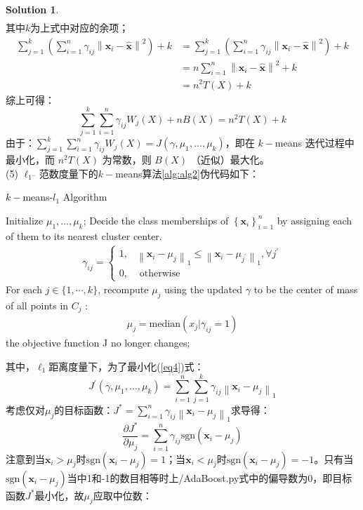 \documentclass[a4paper,UTF8]{article}
\theoremstyle{definition}
\newtheorem*{solution}{Solution}
\begin{document}
\begin{solution}
\begin{align*}
	\end{align*}
	其中$k$为上式中对应的余项；
	\begin{align*}
	\sum_{j=1}^{k}\left(\sum_{i=1}^{n}\gamma_{i j}\left\|\mathbf{x}_{i}-\hat{\mathbf{x}}\right\|^{2}\right)+k&=\sum_{j=1}^{k}\left(\sum_{i=1}^{n}\gamma_{i j}\left\|\mathbf{x}_{i}-\hat{\mathbf{x}}\right\|^{2}\right)+k\\&=n\sum_{i=1}^{n}\left\|\mathbf{x}_{i}-\hat{\mathbf{x}}\right\|^{2}+k\\&=n^2T(X)+k
	\end{align*}	
	综上可得：$$\sum_{j=1}^{k}\sum_{i=1}^{n}\gamma_{i j}W_j(X)+nB(X)=n^2T(X)+k$$ 
	由于：$\sum_{j=1}^{k}\sum_{i=1}^{n}\gamma_{i j}W_j(X)=J\left(\gamma, \mu_{1}, \ldots, \mu_{k}\right)$，即在 $k-$means 迭代过程中最小化，而 $n^2T(X)$ 为常数，则 $B(X)$ （近似）最大化。
 \\(5) $\ell_{1^{-}}$范数度量下的$k-$means算法\ref{alg:alg2}伪代码如下：\\
 {\begin{algorithm}[htbp]
		\caption{ $k-$means-$l_1$ Algorithm }
		\label{alg:alg2}
		\begin{algorithmic}[1]{
				\STATE Initialize $\mu_{1}, \ldots, \mu_{k}$;
				\REPEAT
				 Decide the class memberships of $\left\{\mathbf{x}_{i}\right\}_{i=1}^{n}$ by assigning each of them to its nearest cluster center.
				\begin{align}\nonumber\gamma_{i j}=\left\{\begin{array}{ll}
				1, & \left\|\mathbf{x}_{i}-\mu_{j}\right\|_{1} \leq\left\|\mathbf{x}_{i}-\mu_{j^{\prime}}\right\|_{1}, \forall j^{\prime} \\
				0, & \text { otherwise }
				\end{array}\right.\end{align}
				 For each $j \in\{1, \cdots, k\}$, recompute $\mu_j$ using the updated $\gamma$ to be	the center of mass of all points in $C_j$ :
			\begin{align}\nonumber\mu_{j}=\text{median}(x_j|\gamma_{i j}=1)
			\end{align}	
				\UNTIL the objective function J no longer changes;}
		\end{algorithmic}
\end{algorithm}}
其中，$\ell_1$距离度量下，为了最小化(\ref{eq4})式：
$$J^{\prime}\left(\gamma, \mu_{1}, \ldots, \mu_{k}\right)=\sum_{i=1}^{n} \sum_{j=1}^{k} \gamma_{i j}\left\|\mathbf{x}_{i}-\mu_{j}\right\|_{1}$$
考虑仅对$\mu_j$的目标函数：$J^*=\sum_{i=1}^{n}\gamma_{i j}\left\|\mathbf{x}_{i}-\mu_{j}\right\|_{1}$求导得：$$\frac{\partial J^*}{\partial\mu_j}=\sum_{i=1}^{n}\gamma_{i j}\text{sgn}\left(\mathbf{x}_{i}-\mu_{j}\right)$$注意到当$\mathbf{x}_{i}>\mu_{j}$时$\text{sgn}\left(\mathbf{x}_{i}-\mu_{j}\right)=1$；当$\mathbf{x}_{i}<\mu_{j}$时$\text{sgn}\left(\mathbf{x}_{i}-\mu_{j}\right)=-1$。只有当$\text{sgn}\left(\mathbf{x}_{i}-\mu_{j}\right)$当中1和-1的数目相等时上/AdaBoost.py式中的偏导数为0，即目标函数$J^*$最小化，故$\mu_j$应取中位数：

\end{solution}
\end{document}
